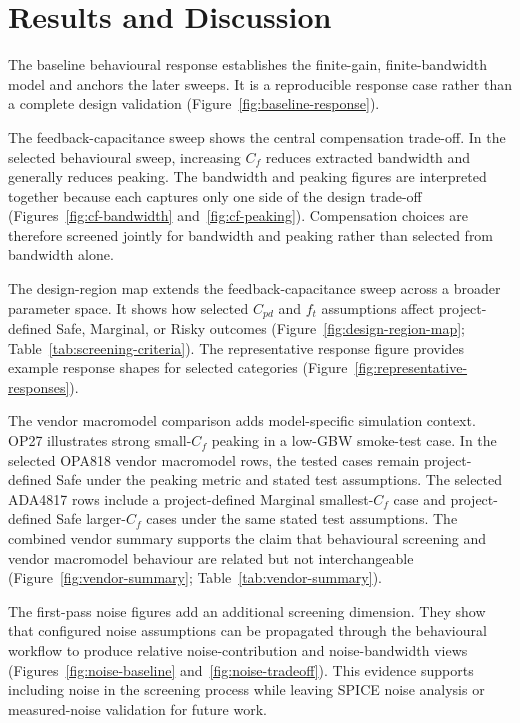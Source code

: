 \section{Results and Discussion}

The baseline behavioural response establishes the finite-gain, finite-bandwidth model and anchors the later sweeps. It is a reproducible response case rather than a complete design validation (Figure~\ref{fig:baseline-response}).

The feedback-capacitance sweep shows the central compensation trade-off. In the selected behavioural sweep, increasing $C_f$ reduces extracted bandwidth and generally reduces peaking. The bandwidth and peaking figures are interpreted together because each captures only one side of the design trade-off (Figures~\ref{fig:cf-bandwidth} and~\ref{fig:cf-peaking}). Compensation choices are therefore screened jointly for bandwidth and peaking rather than selected from bandwidth alone.

The design-region map extends the feedback-capacitance sweep across a broader parameter space. It shows how selected $C_{pd}$ and $f_t$ assumptions affect project-defined Safe, Marginal, or Risky outcomes (Figure~\ref{fig:design-region-map}; Table~\ref{tab:screening-criteria}). The representative response figure provides example response shapes for selected categories (Figure~\ref{fig:representative-responses}).

The vendor macromodel comparison adds model-specific simulation context. OP27 illustrates strong small-$C_f$ peaking in a low-GBW smoke-test case. In the selected OPA818 vendor macromodel rows, the tested cases remain project-defined Safe under the peaking metric and stated test assumptions. The selected ADA4817 rows include a project-defined Marginal smallest-$C_f$ case and project-defined Safe larger-$C_f$ cases under the same stated test assumptions. The combined vendor summary supports the claim that behavioural screening and vendor macromodel behaviour are related but not interchangeable (Figure~\ref{fig:vendor-summary}; Table~\ref{tab:vendor-summary}).

The first-pass noise figures add an additional screening dimension. They show that configured noise assumptions can be propagated through the behavioural workflow to produce relative noise-contribution and noise-bandwidth views (Figures~\ref{fig:noise-baseline} and~\ref{fig:noise-tradeoff}). This evidence supports including noise in the screening process while leaving SPICE noise analysis or measured-noise validation for future work.

